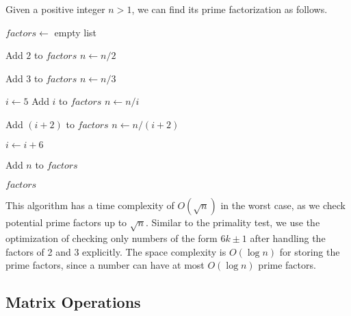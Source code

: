   \begin{algo}
    Given a positive integer $n > 1$, we can find its prime factorization as follows.
    \begin{algorithmic}[1]
       
        \State $factors \gets$ empty list 
        
         
          \State Add $2$ to $factors$
          \State $n \gets n / 2$
        \EndWhile
        
         
          \State Add $3$ to $factors$
          \State $n \gets n / 3$
        \EndWhile
        
        \State $i \gets 5$ 
         
           
            \State Add $i$ to $factors$
            \State $n \gets n / i$
          \EndWhile
          
           
            \State Add $(i + 2)$ to $factors$
            \State $n \gets n / (i + 2)$
          \EndWhile
          
          \State $i \gets i + 6$ 
        \EndWhile
        
         
          \State Add $n$ to $factors$
        \EndIf
        
        \State \Return $factors$ 
      \EndProcedure
    \end{algorithmic}
    This algorithm has a time complexity of $O(\sqrt{n})$ in the worst case, as we check potential prime factors up to $\sqrt{n}$. Similar to the primality test, we use the optimization of checking only numbers of the form $6k \pm 1$ after handling the factors of 2 and 3 explicitly. The space complexity is $O(\log n)$ for storing the prime factors, since a number can have at most $O(\log n)$ prime factors.
  \end{algo}

\subsection{Matrix Operations}

